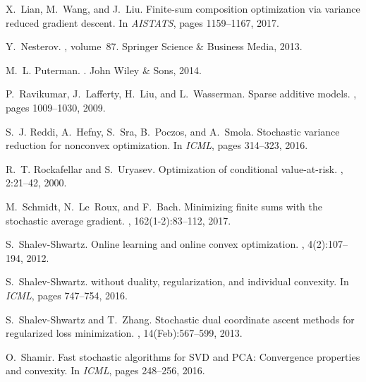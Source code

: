 \documentclass[11pt]{article}
\begin{document}
\begin{thebibliography}{10}
X.~Lian, M.~Wang, and J.~Liu.
\newblock Finite-sum composition optimization via variance reduced gradient descent.
\newblock In {\em AISTATS}, pages 1159--1167, 2017.

Y.~Nesterov.
, volume~87.
\newblock Springer Science \& Business Media, 2013.

M.~L. Puterman.
.
\newblock John Wiley \& Sons, 2014.

P.~Ravikumar, J.~Lafferty, H.~Liu, and L.~Wasserman.
\newblock Sparse additive models.
, pages 1009--1030, 2009.

S.~J. Reddi, A.~Hefny, S.~Sra, B.~Poczos, and A.~Smola.
\newblock Stochastic variance reduction for nonconvex optimization.
\newblock In {\em ICML}, pages 314--323, 2016.

R.~T. Rockafellar and S.~Uryasev.
\newblock Optimization of conditional value-at-risk.
, 2:21--42, 2000.

M.~Schmidt, N.~Le~Roux, and F.~Bach.
\newblock Minimizing finite sums with the stochastic average gradient.
, 162(1-2):83--112, 2017.

S.~Shalev-Shwartz.
\newblock Online learning and online convex optimization.
, 4(2):107--194, 2012.

S.~Shalev-Shwartz.
 without duality, regularization, and individual convexity.
\newblock In {\em ICML}, pages 747--754, 2016.

S.~Shalev-Shwartz and T.~Zhang.
\newblock Stochastic dual coordinate ascent methods for regularized loss minimization.
, 14(Feb):567--599, 2013.

O.~Shamir.
\newblock Fast stochastic algorithms for {SVD} and {PCA}: Convergence properties and convexity.
\newblock In {\em ICML}, pages 248--256, 2016.


\end{thebibliography}
\end{document}
